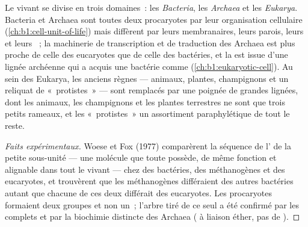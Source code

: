 \begin{proposition}\label{prop:b1:classifying-biodiversity:domains}
Le vivant se divise en trois domaines~: les \emph{Bacteria}, les
\emph{Archaea} et les \emph{Eukarya}. Bacteria et Archaea sont toutes
deux procaryotes par leur organisation cellulaire
(\cref{ch:b1:cell-unit-of-life}) mais diffèrent par leurs 
membranaires, leurs parois, leurs  et leurs ~;
la machinerie de transcription et de traduction des Archaea est plus
proche de celle des eucaryotes que de celle des bactéries, et la
 est issue d'une lignée archéenne qui a acquis une
bactérie comme  (\cref{ch:b1:eukaryotic-cell}). Au sein des
Eukarya, les anciens règnes --- animaux, plantes, champignons et un
reliquat de «~protistes~» --- sont remplacés par une poignée de grandes
lignées, dont les animaux, les champignons et les plantes terrestres ne
sont que trois petits rameaux, et les «~protistes~» un assortiment
paraphylétique de tout le reste.
\end{proposition}
\begin{proof}[Faits expérimentaux]
Woese et Fox (1977) comparèrent la séquence de l' de la
petite sous-unité --- une molécule que toute  possède, de même
fonction et alignable dans tout le vivant --- chez des bactéries, des
méthanogènes et des eucaryotes, et trouvèrent que les méthanogènes
différaient des autres bactéries autant que chacune de ces deux
différait des eucaryotes. Les procaryotes formaient deux groupes et non
un~; l'arbre tiré de ce seul  a été confirmé par les 
complets et par la biochimie distincte des Archaea ( à liaison
éther, pas de ).
\end{proof}

